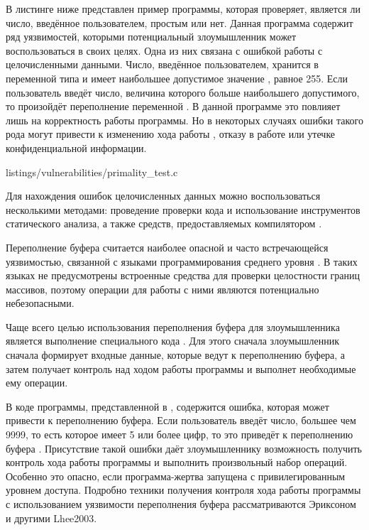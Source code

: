 %
В листинге ниже представлен пример программы, которая проверяет, является ли число, введённое 
пользователем, простым или нет. 
%
Данная программа содержит ряд уязвимостей, которыми потенциальный злоумышленник может 
воспользоваться в своих целях. 
%
Одна из них связана с ошибкой работы с целочисленными данными.
%
Число, введённое пользователем, хранится в переменной  типа 
 и имеет наибольшее допустимое значение , равное 
255.
%
Если пользователь введёт число, величина которого больше наибольшего допустимого, то произойдёт 
переполнение переменной . 
%
В данной программе это повлияет лишь на корректность работы программы. 
%
Но в некоторых случаях ошибки такого рода могут привести к изменению хода работы 
, отказу в работе или утечке конфиденциальной информации.

	{listings/vulnerabilities/primality_test.c}

%
Для нахождения ошибок целочисленных данных можно воспользоваться несколькими методами: проведение 
проверки кода и использование инструментов статического анализа, а также средств, предоставляемых 
компилятором  .



%
Переполнение буфера считается наиболее опасной и часто встречающейся уязвимостью, связанной 
с языками программирования среднего уровня . 
%
В таких языках не предусмотрены встроенные средства для проверки целостности границ массивов, 
поэтому операции для работы с ними являются потенциально небезопасными. 

%
Чаще всего целью использования переполнения буфера для злоумышленника является выполнение 
специального кода . 
%
Для этого сначала злоумышленник сначала формирует входные данные, которые ведут к переполнению 
буфера, а затем получает контроль над ходом работы программы и выполнет необходимые ему операции. 

%
В коде программы, представленной в  
, содержится ошибка, которая 
может привести к переполнению буфера.
%
Если пользователь введёт число, большее чем 9999, то есть которое имеет 5 или более цифр, то это 
приведёт к переполнению буфера .
%
Присутствие такой ошибки даёт злоумышленнику возможность получить контроль хода работы программы и 
выполнить произвольный набор операций.
%
Особенно это опасно, если программа-жертва запущена с привилегированным уровнем доступа.
%
Подробно техники получения контроля хода работы программы с использованием уязвимости переполнения 
буфера рассматриваются Эриксоном и другими  {Lhee2003}.

